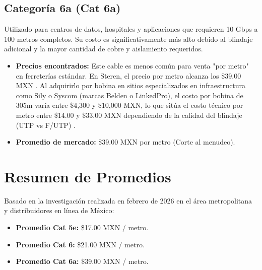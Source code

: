 \documentclass[a4paper,12pt]{article}
\begin{document}
\subsection*{Categoría 6a (Cat 6a)}
Utilizado para centros de datos, hospitales y aplicaciones que requieren 10 Gbps a 100 metros completos. Su costo es significativamente más alto debido al blindaje adicional y la mayor cantidad de cobre y aislamiento requeridos.

\begin{itemize}
    \item \textbf{Precios encontrados:} Este cable es menos común para venta "por metro" en ferreterías estándar. En Steren, el precio por metro alcanza los \$39.00 MXN \cite{steren2026}. Al adquirirlo por bobina en sitios especializados en infraestructura como Sily o Syscom (marcas Belden o LinkedPro), el costo por bobina de 305m varía entre \$4,300 y \$10,000 MXN, lo que sitúa el costo técnico por metro entre \$14.00 y \$33.00 MXN dependiendo de la calidad del blindaje (UTP vs F/UTP) \cite{sily2026}.
    \item \textbf{Promedio de mercado:} \$39.00 MXN por metro (Corte al menudeo).
\end{itemize}

\section*{Resumen de Promedios}
Basado en la investigación realizada en febrero de 2026 en el área metropolitana y distribuidores en línea de México:

\begin{itemize}
    \item \textbf{Promedio Cat 5e:} \$17.00 MXN / metro.
    \item \textbf{Promedio Cat 6:} \$21.00 MXN / metro.
    \item \textbf{Promedio Cat 6a:} \$39.00 MXN / metro.
\end{itemize}
\end{document}
